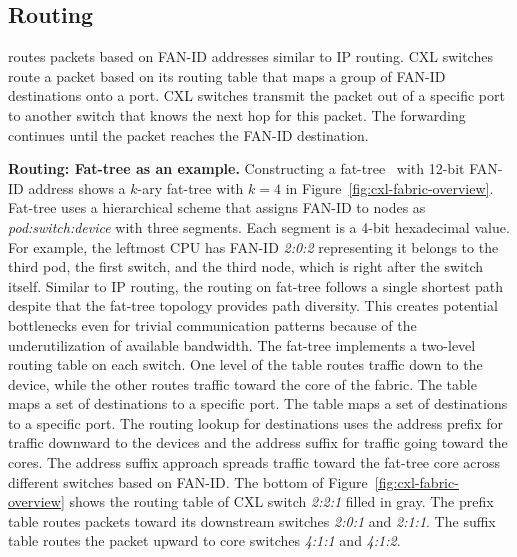 
\subsection{Routing}
\label{aurelia:sec:design:routing}
\aurelia routes packets based on FAN-ID addresses similar to IP routing.
%
CXL switches route a packet based on its routing table that maps a group of FAN-ID destinations onto a port. 
%
CXL switches transmit the packet out of a specific port to another switch that knows the next hop for this packet. 
%
The forwarding continues until the packet reaches the FAN-ID destination.

\noindent \textbf{Routing: Fat-tree as an example.}
%
Constructing a fat-tree~\cite{fat-tree:sigcomm:2008} with 12-bit FAN-ID address shows a $k$-ary fat-tree with $k=4$ in Figure~\ref{fig:cxl-fabric-overview}.
%
Fat-tree uses a hierarchical scheme that assigns FAN-ID to nodes as \emph{pod:switch:device} with three segments.
%
Each segment is a 4-bit hexadecimal value.  
%
For example, the leftmost CPU has FAN-ID \emph{2:0:2} representing it belongs to the third pod, the first switch, and the third node, which is right after the switch itself.
%
Similar to IP routing, the routing on fat-tree follows a single shortest path despite that the fat-tree topology provides path diversity.
%
This creates potential bottlenecks even for trivial communication patterns because of the underutilization of available bandwidth.
%
The fat-tree implements a two-level routing table on each switch. 
%
One level of the table routes traffic down to the device, while the other routes traffic toward the core of the fabric.
%
The table maps a set of destinations to a specific port. 
%
The table maps a set of destinations to a specific port. The routing lookup for destinations uses the address prefix for traffic downward to the devices and the address suffix for traffic going toward the cores.
%
The address suffix approach spreads traffic toward the fat-tree core across different switches based on FAN-ID.
%
The bottom of Figure~\ref{fig:cxl-fabric-overview} shows the routing table of CXL switch \emph{2:2:1} filled in gray.
%
The prefix table routes packets toward its downstream switches \emph{2:0:1} and \emph{2:1:1}. 
%
The suffix table routes the packet upward to core switches \emph{4:1:1} and \emph{4:1:2}.  
%


